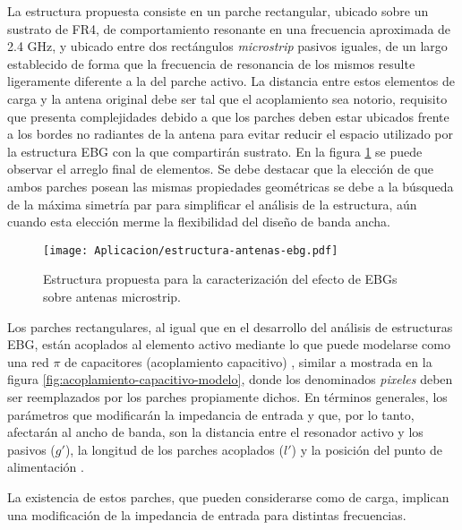 La estructura propuesta consiste en un parche rectangular, ubicado sobre un sustrato de FR4, de comportamiento resonante en una frecuencia aproximada de 2.4 GHz, y ubicado entre dos rectángulos \textit{microstrip} pasivos iguales, de un largo establecido de forma que la frecuencia de resonancia de los mismos resulte ligeramente diferente a la del parche activo. La distancia entre estos elementos de carga y la antena original debe ser tal que el acoplamiento sea notorio, requisito que presenta complejidades \cite{Kumar:radiating} debido a que los parches deben estar ubicados frente a los bordes no radiantes de la antena para evitar reducir el espacio utilizado por la estructura EBG con la que compartirán sustrato. En la figura \ref{fig:antena-propuesta-con-ebg} se puede observar el arreglo final de elementos. Se debe destacar que la elección de que ambos parches posean las mismas propiedades geométricas se debe a la búsqueda de la máxima simetría par para simplificar el análisis de la estructura, aún cuando esta elección merme la flexibilidad del diseño de banda ancha.

\begin{figure}[h]
	\centering
	\texttt{[image: Aplicacion/estructura-antenas-ebg.pdf]}
	\caption{Estructura propuesta para la caracterización del efecto de EBGs sobre antenas microstrip.}
	\label{fig:antena-propuesta-con-ebg}
\end{figure}


Los parches rectangulares, al igual que en el desarrollo del análisis de estructuras EBG, están acoplados al elemento activo mediante lo que puede modelarse como una red $\pi$ de capacitores (acoplamiento capacitivo) \cite{Kumar:Non-radiating}, similar a mostrada en la figura \ref{fig:acoplamiento-capacitivo-modelo}, donde los denominados \textit{pixeles} deben ser reemplazados por los parches propiamente dichos. En términos generales, los parámetros que modificarán la impedancia de entrada y que, por lo tanto, afectarán al ancho de banda, son la distancia entre el resonador activo y los pasivos ($g'$), la longitud de los parches acoplados ($l'$) y la posición del punto de alimentación \cite{Kumar:Non-radiating}.

La existencia de estos parches, que pueden considerarse como de carga, implican una modificación de la impedancia de entrada para distintas frecuencias.

